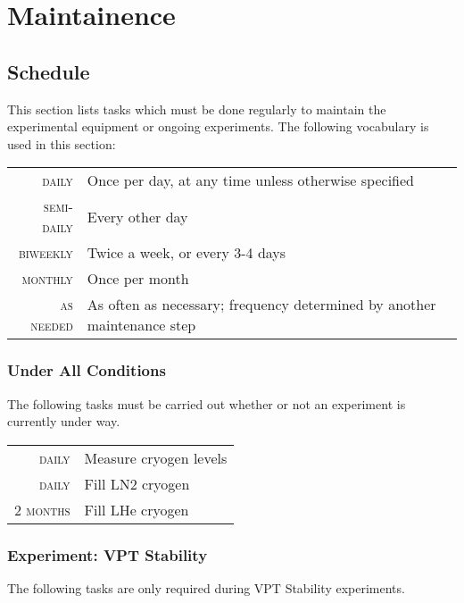 \chapter{Maintainence}
\label{sec:op_maintenance}

\section{Schedule}
\label{sec:op_maintenance:schedule}

This section lists tasks which must be done regularly to maintain the experimental equipment or ongoing experiments.  The following vocabulary is used in this section:
\begin{table}[h]\begin{tabular}{>{\scshape}r p{\textwidth}}
    daily & Once per day, at any time unless otherwise specified\\
    semi-daily & Every other day\\
    biweekly & Twice a week, or every 3-4 days\\
    monthly & Once per month\\
    as needed & As often as necessary; frequency determined by another maintenance step\\
\end{tabular}\end{table}

\subsection{Under All Conditions}
\label{sec:op_maintenance:always}
The following tasks must be carried out whether or not an experiment is currently under way.  

\begin{table}[h]\begin{tabular}{>{\scshape}r p{\textwidth}}
    daily & Measure cryogen levels\\
    daily & Fill LN2 cryogen\\
    2 months & Fill LHe cryogen\\
\end{tabular}\end{table}

\subsection{Experiment: VPT Stability}
\label{sec:op_maintenance:ex_vpt_stability}
The following tasks are only required during VPT Stability experiments.

